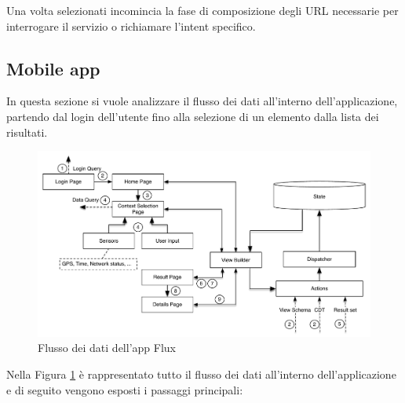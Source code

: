 Una volta selezionati incomincia la fase di composizione degli URL necessarie per interrogare il servizio o richiamare l'intent specifico.

\subsection{Mobile app}

In questa sezione si vuole analizzare il flusso dei dati all'interno dell'applicazione, partendo dal login dell'utente fino alla selezione di un elemento dalla lista dei risultati.

\begin{figure}[H]
	\centering
	\includegraphics[width=\textwidth]{4-progettazione-alto-livello/Immagini/app_dataflow.pdf}
	\caption{Flusso dei dati dell'app Flux}\label{fig:app-dataflow}
\end{figure}

Nella Figura \ref{fig:app-dataflow} è rappresentato tutto il flusso dei dati all'interno dell'ap\-pli\-ca\-zio\-ne e di seguito vengono esposti i passaggi principali:

